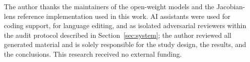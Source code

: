 The author thanks the maintainers of the open-weight models and the Jacobian-lens reference implementation used in this work. AI assistants were used for coding support, for language editing, and as isolated adversarial reviewers within the audit protocol described in Section~\ref{sec:system}; the author reviewed all generated material and is solely responsible for the study design, the results, and the conclusions. This research received no external funding.
